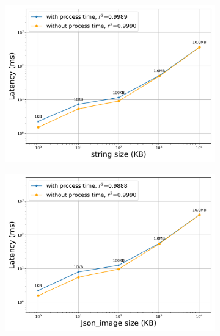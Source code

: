 \begin{figure}[htb]
    \begin{subfigure}[b]{0.49\textwidth}
        \centering
        \includegraphics[width=\textwidth]{figures/tests/proportional_tests/Rest_log_Average_string_messages_sending_time_of_100_tests.png}\hfill 
        \caption{} \label{fig: proportional-rest-stringsize-c}
    \end{subfigure}
    \begin{subfigure}[b]{0.49\textwidth}
        \centering
        \includegraphics[width=\textwidth]{figures/tests/proportional_tests/Rest_log_Average_string_messages_receiving_time_of_100_tests.png}\hfill 
        \caption{} \label{fig: proportional-rest-stringsize-d}
    \end{subfigure}


\end{figure}
